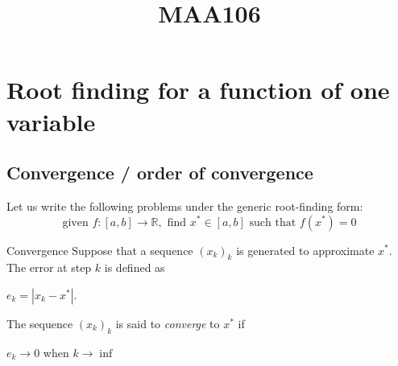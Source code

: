 \documentclass{article}
\title{MAA106}
\begin{document}

\section{Root finding for a function of one variable}

    \subsection{Convergence / order of convergence}

        Let us write the following problems under the generic root-finding form:
        \begin{equation}
            \text{given } f: [a,b] \rightarrow \mathbb{R}, \text{ find } x^* \in [a,b] \text{ such that } f(x^*)=0 \nonumber
        \end{equation}


        \begin{definition}{Convergence}
            Suppose that a sequence $(x_k)_k$ is generated to approximate $x^*$. The error at step $k$ is defined as
            
            \centerline{$e_k = |x_k - x^*|. $}
            

            The sequence $(x_k)_k$ is said to \textit{converge} to $x^*$ if

            \centerline{$e_k \longrightarrow 0$ when $k \rightarrow \inf$}
        \end{definition}

        \vspace{10pt}
\end{document}

